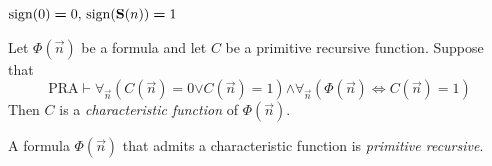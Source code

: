 \documentclass[10pt]{amsart}
\newcommand{\mforall}{\boldsymbol{\forall}}
\newcommand{\mequiv}{\boldsymbol{\Leftrightarrow}}
\newcommand{\mand}{\boldsymbol{\wedge}}
\newcommand{\mor}{\boldsymbol{\vee}}
\newcommand{\meq}{\boldsymbol{=}}
\begin{document}
\begin{definition}
	$\mathrm{sign}(0) \meq 0,\,\mathrm{sign}(\bd{S}(n)) \meq 1$
\end{definition}

\begin{definition}
	Let $\Phi(\vec{n})$ be a formula and let $C$ be a primitive recursive function. Suppose that
	$$\mathrm{PRA}\vdash \mforall_{\vec{n}}\left(C(\vec{n}) \meq 0 \mor C(\vec{n}) \meq 1\right) \mand \mforall_{\vec{n}}\left(\Phi(\vec{n}) \mequiv C(\vec{n}) \meq 1\right)$$
	Then $C$ is a \textit{characteristic function} of $\Phi(\vec{n})$.
\end{definition}

\begin{definition}
	A formula $\Phi(\vec{n})$ that admits a characteristic function is \textit{primitive recursive}.
\end{definition}
\end{document}
